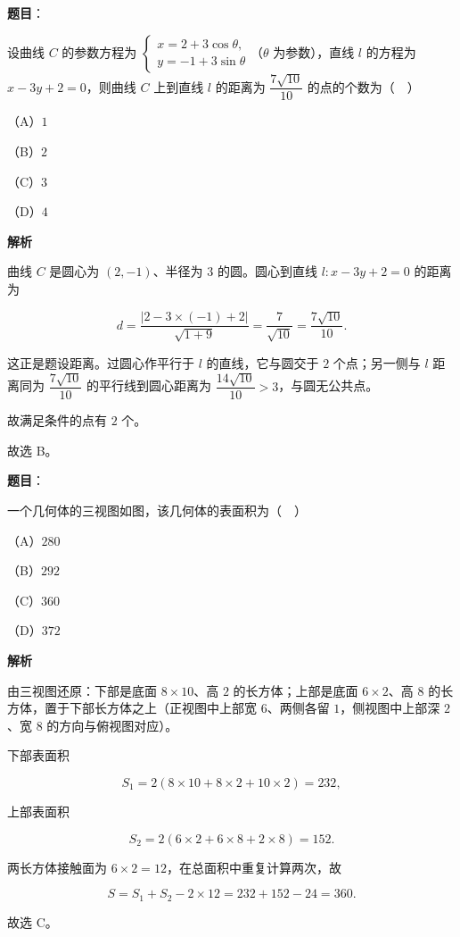\begin{answer}

\textbf{题目}：

设曲线 $C$ 的参数方程为 $\begin{cases}x=2+3\cos\theta,\\ y=-1+3\sin\theta\end{cases}$（$\theta$ 为参数），直线 $l$ 的方程为 $x-3y+2=0$，则曲线 $C$ 上到直线 $l$ 的距离为 $\dfrac{7\sqrt{10}}{10}$ 的点的个数为（　）

（A）$1$

（B）$2$

（C）$3$

（D）$4$

\textbf{解析}

曲线 $C$ 是圆心为 $(2,-1)$、半径为 $3$ 的圆。圆心到直线 $l:x-3y+2=0$ 的距离为

\nopagebreak[4]
\[d=\frac{|2-3\times(-1)+2|}{\sqrt{1+9}}
=\frac{7}{\sqrt{10}}=\frac{7\sqrt{10}}{10}.\]

这正是题设距离。过圆心作平行于 $l$ 的直线，它与圆交于 $2$ 个点；另一侧与 $l$ 距离同为 $\dfrac{7\sqrt{10}}{10}$ 的平行线到圆心距离为 $\dfrac{14\sqrt{10}}{10}>3$，与圆无公共点。

故满足条件的点有 $2$ 个。

故选 B。


\end{answer}
\begin{answer}

\textbf{题目}：

一个几何体的三视图如图，该几何体的表面积为（　）
\nopagebreak[4]
\begin{center}\end{center}
\nopagebreak[4]
（A）$280$

（B）$292$

（C）$360$

（D）$372$

\textbf{解析}

由三视图还原：下部是底面 $8\times10$、高 $2$ 的长方体；上部是底面 $6\times2$、高 $8$ 的长方体，置于下部长方体之上（正视图中上部宽 $6$、两侧各留 $1$，侧视图中上部深 $2$、宽 $8$ 的方向与俯视图对应）。

下部表面积

\nopagebreak[4]
\[S_1=2(8\times10+8\times2+10\times2)=232,\]

上部表面积

\nopagebreak[4]
\[S_2=2(6\times2+6\times8+2\times8)=152.\]

两长方体接触面为 $6\times2=12$，在总面积中重复计算两次，故

\nopagebreak[4]
\[S=S_1+S_2-2\times12=232+152-24=360.\]

故选 C。


\end{answer}
